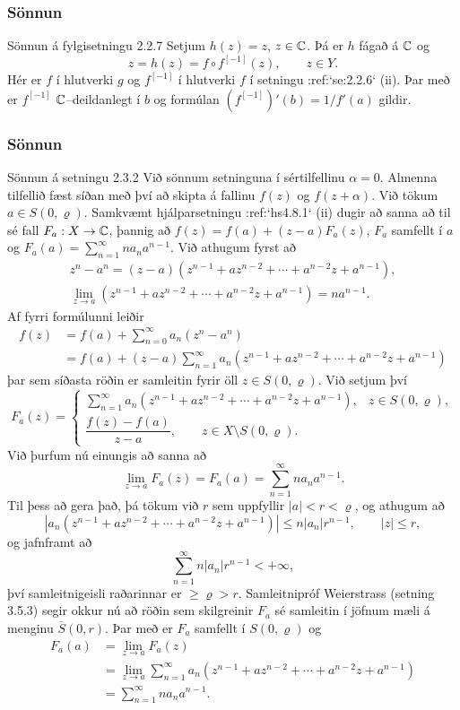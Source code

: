 \subsubsection{Sönnun}{Sönnun á fylgisetningu 2.2.7}
  Setjum $h(z)=z$, $z\in {\mathbb C}$.  Þá er $h$ fágað á ${\mathbb C}$ og 
 $$z=h(z)=f\circ f^{[-1]}(z), \qquad z\in Y.
 $$
Hér er $f$ í hlutverki $g$ og $f^{[-1]}$ í hlutverki $f$ í setningu
:ref:`se:2.2.6` (ii).  Þar með er $f^{[-1]}$ ${\mathbb C}$--deildanlegt í $b$ og  
formúlan $(f^{[-1]})'(b)=1/f'(a)$ gildir.  




\subsubsection{Sönnun}{Sönnun á setningu 2.3.2}   
  Við sönnum setninguna í sértilfellinu $\alpha=0$.
Almenna tilfellið fæst síðan með því að skipta á fallinu $f(z)$ og
$f(z+\alpha)$.    Við tökum $a\in S(0,\varrho)$.
Samkvæmt hjálparsetningu :ref:`hs4.8.1` (ii) dugir að sanna að
til sé fall $F_a:X\to {\mathbb C}$, þannig að  $f(z)=f(a)+(z-a)F_a(z)$, 
 $F_a$ samfellt í $a$ og $F_a(a)=\sum_{n=1}^\infty na_na^{n-1}$.  Við
athugum fyrst að 
\begin{gather*}
z^n-a^n=(z-a)(z^{n-1}+az^{n-2}+\cdots+a^{n-2}z+a^{n-1}),\\
 \lim_{z\to a}(z^{n-1}+az^{n-2}+\cdots+a^{n-2}z+a^{n-1}) = na^{n-1}.
\end{gather*}
Af fyrri formúlunni leiðir
\begin{align*}
f(z)&=f(a)+\sum_{n=0}^\infty a_n(z^n-a^n)\\
&=f(a)+(z-a)\sum_{n=1}^\infty 
a_n (z^{n-1}+az^{n-2}+\cdots+a^{n-2}z+a^{n-1})
\end{align*}
þar sem síðasta röðin er samleitin fyrir öll $z\in S(0,\varrho)$.
Við setjum því 
 $$F_a(z)=\begin{cases}    
\sum_{n=1}^\infty a_n
(z^{n-1}+az^{n-2}+\cdots+a^{n-2}z+a^{n-1}),
&z\in S(0,\varrho),\\
\dfrac{f(z)-f(a)}{z-a}, \qquad z\in X\setminus S(0,\varrho).
\end{cases}
 $$
Við þurfum nú einungis að sanna að 
 $$\lim_{z\to a} F_a(z)=F_a(a)=\sum_{n=1}^\infty na_na^{n-1}.
 $$
Til þess að gera það, þá tökum við $r$ sem uppfyllir $|a|<r<\varrho$,
og athugum að 
 $$
|a_n(z^{n-1}+az^{n-2}+\cdots+a^{n-2}z+a^{n-1})|\leq n|a_n|r^{n-1},
\qquad |z|\leq r,
 $$
og jafnframt að  
 $$\sum_{n=1}^\infty n|a_n|r^{n-1}<+\infty,
 $$
því samleitnigeisli raðarinnar er $\geq \varrho>r$.
Samleitnipróf Weierstrass (setning 3.5.3) 
segir okkur nú að röðin sem skilgreinir 
$F_a$ sé samleitin í jöfnum mæli á menginu $\overline S(0,r)$. 
Þar með er $F_a$ samfellt í $S(0,\varrho)$ og 
\begin{align*}
F_a(a)&=\lim_{z\to a} F_a(z)\\
&=  \lim_{z\to a}
\sum_{n=1}^\infty a_n (z^{n-1}+az^{n-2}+\cdots+a^{n-2}z+a^{n-1})\\
&=\sum_{n=1}^\infty na_na^{n-1}.
\end{align*}




